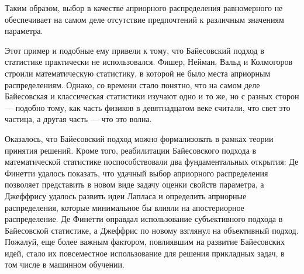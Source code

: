 Таким образом, выбор в качестве априорного распределения равномерного не обеспечивает на самом деле 
отсутствие предпочтений к различным значениям параметра.

Этот пример и подобные ему привели к тому, что Байесовский подход в статистике практически не использовался.
Фишер, Нейман, Вальд и Колмогоров строили математическую статистику, в которой не было места априорным распределениям.
Однако, со времени стало понятно, что на самом деле Байесовская и классическая статистики изучают одно и то же, 
но с разных сторон --- подобно тому, как часть физиков в девятнадцатом веке считали, что свет это частица,
а другая часть --- что это волна.

Оказалось, что Байесовский подход можно формализовать в рамках теории принятия решений.
Кроме того, реабилитации Байесовского подхода в математической статистике поспособствовали 
два фундаментальных открытия: 
Де Финетти удалось показать, что удачный выбор априорного распределения позволяет представить в новом виде задачу оценки свойств параметра, 
а Джеффрису удалось развить идеи Лапласа и определить априорные распределения, которые минимальное бы влияли на апостериорное распределение.
Де Финетти оправдал использование субъективного подхода в Байесовской статистике, 
а Джеффрис по новому взглянул на объективный подход.
Пожалуй, еще более важным фактором, повлиявшим на развитие Байесовских идей, стало их повсеместное использование для решения прикладных задач,
в том числе в машинном обучении.


